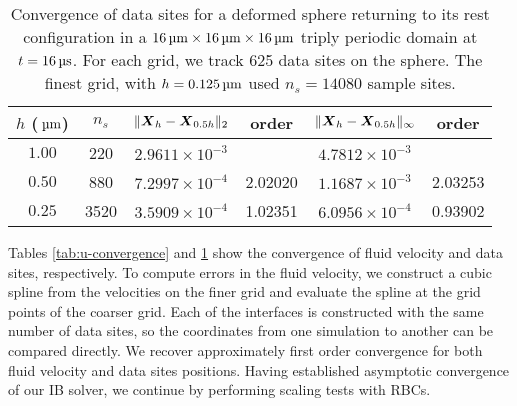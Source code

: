 \begin{table*}[ht]
    \begin{center}
        \begingroup
        \setlength{\tabcolsep}{9pt}
        \renewcommand{\arraystretch}{1.5}
        \begin{tabular}{cc|cc|cc}
                                                                                                             \\ \toprule
            $h$ ($\um$) & $n_s$ & $\|\boldsymbol{X}_h-\boldsymbol{X}_{0.5h}\|_2$ & order   & $\|\boldsymbol{X}_h-\boldsymbol{X}_{0.5h}\|_{\infty}$ & order   \\ \midrule
            $1.00$      & 220   & $2.9611\times10^{-3}$  &         & $4.7812\times10^{-3}$         &         \\
            $0.50$      & 880   & $7.2997\times10^{-4}$  & 2.02020 & $1.1687\times10^{-3}$         & 2.03253 \\
            $0.25$      & 3520  & $3.5909\times10^{-4}$  & 1.02351 & $6.0956\times10^{-4}$         & 0.93902 \\ \bottomrule
        \end{tabular}
        \endgroup
    \end{center}
    \caption{%
Convergence of data sites for a deformed sphere returning to its rest
configuration in a $16\um\times16\um\times16\um$ triply periodic domain at
$t=16\us$. For each grid, we track 625 data sites on the sphere. The finest
grid, with $h = 0.125\um$ used $n_s=14080$ sample sites.
    }
    \label{tab:x-convergence}
\end{table*}

Tables \ref{tab:u-convergence} and \ref{tab:x-convergence} show the convergence
of fluid velocity and data sites, respectively. To compute errors in the fluid
velocity, we construct a cubic spline from the velocities on the finer grid
and evaluate the spline at the grid points of the coarser grid. Each of the
interfaces is constructed with the same number of data sites, so the
coordinates from one simulation to another can be compared directly. We recover
approximately first order convergence for both fluid velocity and data sites
positions. Having established asymptotic convergence of our IB solver, we
continue by performing scaling tests with RBCs.
